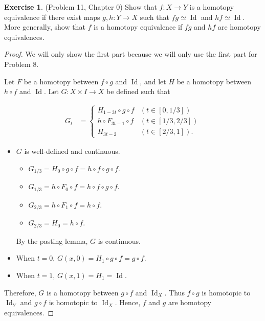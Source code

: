 \documentclass[12pt, psamsfonts]{amsart}
\theoremstyle{definition}
\newtheorem*{exer}{Exercise}
\theoremstyle{remark}
\DeclareMathOperator{\Id}{Id}
\numberwithin{equation}{section}
\begin{document}
\begin{exer}{(Problem 11, Chapter 0)}
  Show that $f: X \rightarrow Y$ is a homotopy equivalence if there exist maps $g, h: Y \rightarrow X$ such that $fg \simeq \Id$ and $hf \simeq \Id$.
  More generally, show that $f$ is a homotopy equivalence if $fg$ and $hf$ are homotopy equivalences.
\end{exer}

\begin{proof}
  We will only show the first part because we will only use the first part for Problem 8.

  Let $F$ be a homotopy between $f \circ g$ and $\Id$, and let $H$ be a homotopy between $h \circ f$ and $\Id$.
  Let $G: X \times I \rightarrow X$ be defined such that 

  \begin{align*}
    G_t &= \begin{cases}
      H_{1 - 3t} \circ g \circ f & (t \in [0, 1/3]) \\
      h \circ F_{3t - 1} \circ f & (t \in [1/3, 2/3]) \\
      H_{3t - 2} & (t \in [2/3, 1]).
    \end{cases}
  \end{align*}

  \begin{itemize}
    \item
      $G$ is well-defined and continuous.
      \begin{itemize}
        \item
          $G_{1/3} = H_0 \circ g \circ f = h \circ f \circ g \circ f$.
        \item
          $G_{1/3} = h \circ F_0 \circ f = h \circ f \circ g \circ f$.
        \item
          $G_{2/3} = h \circ F_1 \circ f = h \circ f$.
        \item
          $G_{2/3} = H_0 = h \circ f$.
      \end{itemize}
      By the pasting lemma, $G$ is continuous.
    \item
      When $t = 0$, $G(x, 0) = H_1 \circ g \circ f = g \circ f$.
    \item
      When $t = 1$, $G(x, 1) = H_1 = \Id$.
  \end{itemize}

  Therefore, $G$ is a homotopy between $g \circ f$ and $\Id_X$.
  Thus $f \circ g$ is homotopic to $\Id_Y$ and $g \circ f$ is homotopic to $\Id_X$.
  Hence, $f$ and $g$ are homotopy equivalences.
\end{proof}
\end{document}
